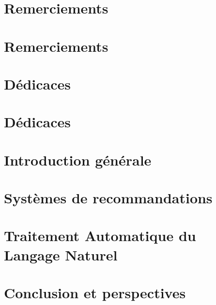 \documentclass[12pt]{report}
\begin{document}
\renewcommand{\contentsname}{Sommaire}
\tableofcontents
\clearpage

\listoffigures
\clearpage

\listoftables
\clearpage




% 

\chapter*{Remerciements}    

\chapter*{Remerciements}    


\chapter*{Dédicaces}    

\chapter*{Dédicaces}    


\newpage


\newpage
{} 
\chapter*{Introduction générale}    



\chapter{Systèmes de recommandations}


\chapter{Traitement Automatique du Langage Naturel}


% 

% 

\chapter*{Conclusion et perspectives}    

\newpage
{} 
 

\end{document}
